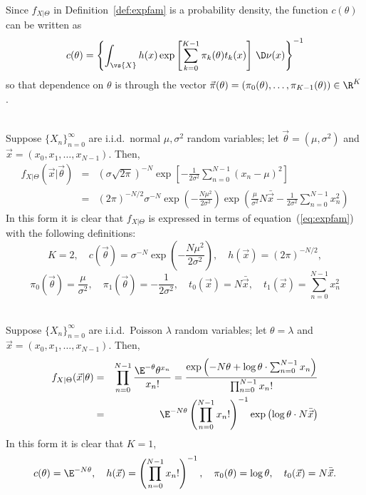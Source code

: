 Since $f_{X|\Theta}$ in Definition~\ref{def:expfam} is a
probability density, the function $c(\theta)$ can be written
as
\[
c(\theta) = \left\{ 
  \int_{\vs{X}}
  h(x)\exp\left[\sum_{k=0}^{K-1}\pi_k(\theta)t_k(x)\right]
  \, \D \nu(x)
           \right\}^{-1} 
\]
so that dependence on $\theta$ is through the vector 
$\vec{\pi}(\theta) = (\pi_0(\theta), \ldots, \pi_{K-1}(\theta))
\in \R^K$. 

\begin{example}[Gaussian]\\
Suppose $\{X_n\}_{n=0}^\infty$ are i.i.d.~normal $\mu,
\sigma^2$ random variables; let $\vec{\theta} = (\mu, \sigma^2)$
and $\vec{x} = (x_0, x_1, \ldots, x_{N-1})$. Then,
\begin{eqnarray*}
f_{X|\Theta}(\vec{x}|\vec{\theta}) 
&=& \left(\sigma \sqrt{2\pi} \right)^{-N}
  \exp\left[
     -\frac{1}{2\sigma^2}\sum_{n=0}^{N-1}(x_n-\mu)^2 
      \right]\\
&=& (2\pi)^{-N/2}\sigma^{-N}
  \exp\left( -\frac{N\mu^2}{2\sigma^2} \right)
  \exp\left(
\frac{\mu}{\sigma^2}N\bar{\vec{x}}
  -\frac{1}{2\sigma^2}
  \sum_{n=0}^{N-1}x_n^2
  \right)
\end{eqnarray*}
In this form it is clear that $f_{X|\Theta}$ is
expressed in terms of equation~(\ref{eq:expfam}) with the
following definitions:
\[
K=2, \quad 
c(\vec{\theta}) = \sigma^{-N}
   \exp\left( -\frac{N\mu^2}{2\sigma^2}\right), \quad
h(\vec{x}) = (2\pi)^{-N/2},
\]
\[
\pi_0(\vec{\theta}) = \frac{\mu}{\sigma^2}, \quad
\pi_1(\vec{\theta})=  -\frac{1}{2\sigma^2}, \quad
t_0(\vec{x}) = N\bar{\vec{x}}, \quad
t_1(\vec{x}) = \sum_{n=0}^{N-1}x_n^2
\]
\end{example}
\begin{example}[Poisson]\\
Suppose $\{X_n\}_{n=0}^\infty$ are i.i.d.~Poisson $\lambda$
random variables; let $\theta = \lambda$
and $\vec{x} = (x_0, x_1, \ldots, x_{N-1})$. Then,
\begin{eqnarray*}
f_{X|\Theta}(\vec{x}|\theta) 
&=& \prod_{n=0}^{N-1}\frac{\E^{-\theta}\theta^{x_n}}{x_n!}
=\frac{\exp\left(-N\theta + \log \theta \cdot \sum_{n=0}^{N-1}x_n\right)}{\prod_{n=0}^{N-1} x_n!}\\
&=&\E^{-N\theta}\left(\prod_{n=0}^{N-1} x_n!\right)^{-1}
\exp\left(\log \theta \cdot N \bar{\vec{x}}\right)
\end{eqnarray*}
In this form it is clear that $K=1$,
\[
c(\theta) = \E^{-N\theta}, \quad 
h(\vec{x}) = \left(\prod_{n=0}^{N-1} x_n!\right)^{-1}, \quad
\pi_0(\theta) = \log \theta, \quad
t_0(\vec{x}) = N\bar{\vec{x}}.
\]
\end{example}


